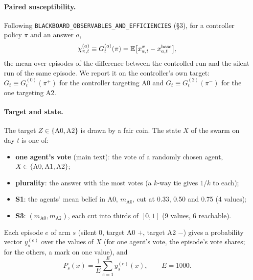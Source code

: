 \documentclass[10pt,a4paper]{article}
\begin{document}
\paragraph{Paired susceptibility.} Following \texttt{BLACKBOARD\_OBSERVABLES\_AND\_EFFICIENCIES} (\S3), for a
controller policy $\pi$ and an answer $a$,
\begin{equation}\label{eq:chi}
\chi^{(a)}_{\pi,t} \equiv G^{(a)}_t(\pi) = \mathbb E\bigl[x^{\pi}_{a,t} - x^{\rm base}_{a,t}\bigr],
\end{equation}
the mean over episodes of the difference between the controlled run and the silent run of the same episode. We
report it on the controller's own target: $G_t \equiv G^{(0)}_t(\pi^{+})$ for the controller targeting A0 and
$G_t \equiv G^{(2)}_t(\pi^{-})$ for the one targeting A2.

\paragraph{Target and state.} The target $Z \in \{\text{A0}, \text{A2}\}$ is drawn by a fair coin. The state $X$
of the swarm on day $t$ is one of:
\begin{itemize}\itemsep1pt
\item \textbf{one agent's vote} (main text): the vote of a randomly chosen agent, $X \in \{\text{A0},\text{A1},\text{A2}\}$;
\item \textbf{plurality}: the answer with the most votes (a $k$-way tie gives $1/k$ to each);
\item \textbf{S1}: the agents' mean belief in A0, $m_{\text{A0}}$, cut at 0.33, 0.50 and 0.75 (4 values);
\item \textbf{S3}: $(m_{\text{A0}}, m_{\text{A2}})$, each cut into thirds of $[0, 1]$ (9 values, 6 reachable).
\end{itemize}
Each episode $e$ of arm $s$ (silent 0, target A0 $+$, target A2 $-$) gives a probability vector $y^{(e)}_s$ over
the values of $X$ (for one agent's vote, the episode's vote shares; for the others, a mark on one value), and
\begin{equation}\label{eq:P}
P_s(x) = \frac1E\sum_{e=1}^{E} y^{(e)}_s(x), \qquad E = 1000 .
\end{equation}
\end{document}

